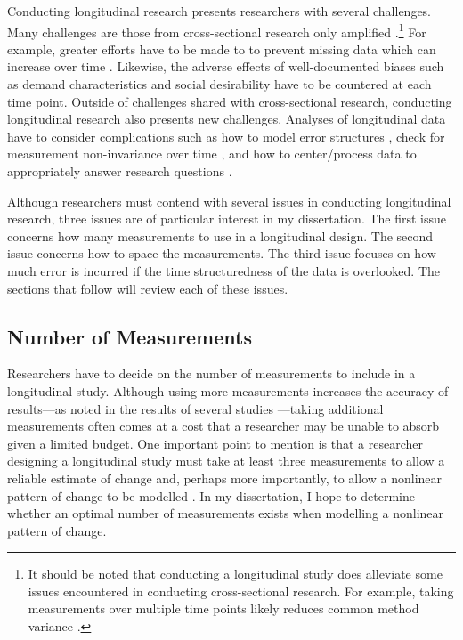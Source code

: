\documentclass[
12pt, %
twoside,
english]{guelphthesis}
\begin{document}
Conducting longitudinal research presents researchers with several challenges. Many challenges are those from cross-sectional research only amplified \autocite[for a review, see][]{bergman1993}.\footnote{It should be noted that conducting a longitudinal study does alleviate some issues encountered in conducting cross-sectional research. For example, taking measurements over multiple time points likely reduces common method variance \parencites{podsakoff2003}[for an example, see ][]{ostroff2002}.} For example, greater efforts have to be made to to prevent missing data which can increase over time \autocite{newman2008,dillman2014}. Likewise, the adverse effects of well-documented biases such as demand characteristics \autocite{orne1962} and social desirability \autocite{nederhof1985} have to be countered at each time point. Outside of challenges shared with cross-sectional research, conducting longitudinal research also presents new challenges. Analyses of longitudinal data have to consider complications such as how to model error structures \autocite{grimm2010a}, check for measurement non-invariance over time \autocite[the extent to which a construct is measured with the same measurement model over time;][]{mellenbergh1989}, and how to center/process data to appropriately answer research questions \autocite{enders2007,wang2015}.

Although researchers must contend with several issues in conducting longitudinal research, three issues are of particular interest in my dissertation. The first issue concerns how many measurements to use in a longitudinal design. The second issue concerns how to space the measurements. The third issue focuses on how much error is incurred if the time structuredness of the data is overlooked. The sections that follow will review each of these issues.

\hypertarget{number-of-measurements}{%
\subsection{Number of Measurements}\label{number-of-measurements}}

Researchers have to decide on the number of measurements to include in a longitudinal study. Although using more measurements increases the accuracy of results---as noted in the results of several studies \autocites[e.g.,][]{coulombe2016,timmons2015,finch2017,fine2019}---taking additional measurements often comes at a cost that a researcher may be unable to absorb given a limited budget. One important point to mention is that a researcher designing a longitudinal study must take at least three measurements to allow a reliable estimate of change and, perhaps more importantly, to allow a nonlinear pattern of change to be modelled \autocite{ployhart2010}. In my dissertation, I hope to determine whether an optimal number of measurements exists when modelling a nonlinear pattern of change.
\end{document}
